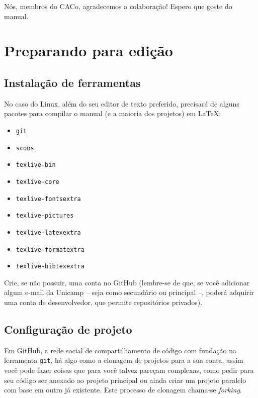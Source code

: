 \documentclass[a4paper,oneside,10pt]{memoir}
\begin{document}
Nós, membros do CACo, agradecemos a colaboração! Espero que goste do manual.

\mainmatter

\chapter{Preparando para edição}

\section{Instalação de ferramentas}

No caso do Linux, além do seu editor de texto preferido, precisará de alguns
pacotes para compilar o manual (e a maioria dos projetos) em \LaTeX:

\begin{multicols}{2}
\begin{itemize}[noitemsep] %
\item \texttt{git}
\item \texttt{scons}
\item \texttt{texlive-bin}
\item \texttt{texlive-core}
\item \texttt{texlive-fontsextra}
\item \texttt{texlive-pictures}
\item \texttt{texlive-latexextra}
\item \texttt{texlive-formatextra}
\item \texttt{texlive-bibtexextra}
\end{itemize}
\end{multicols}

Crie, se não possuir, uma conta no GitHub (lembre-se de que, se você adicionar
algum e-mail da Unicamp -- seja como secundário ou principal --, poderá
adquirir uma conta de desenvolvedor, que permite repositórios privados).

\section{Configuração de projeto}

Em GitHub, a rede social de compartilhamento de código com fundação na
ferramenta \texttt{git}, há algo como a clonagem de projetos para a sua conta,
assim você pode fazer coisas que para você talvez pareçam complexas, como pedir
para seu código ser anexado ao projeto principal ou ainda criar um projeto
paralelo com base em outro já existente. Este processo de clonagem chama-se
\emph{forking}.
\end{document}

